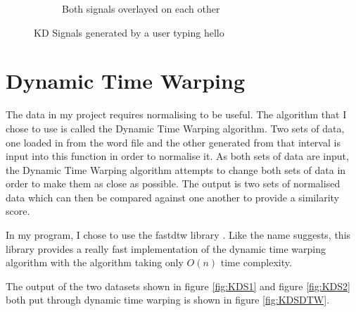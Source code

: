 \documentclass[10pt,a4paper]{report}
\begin{document}
\begin{figure}
\begin{subfigure}[b]{0.3\textwidth}
		\caption{Both signals overlayed on each other}
		\label{fig:KDSBoth}
	\end{subfigure}
	\caption{KD Signals generated by a user typing hello}
	\label{fig:KDS}
\end{figure}

\section{Dynamic Time Warping}

The data in my project requires normalising to be useful. The algorithm that I chose to use is called the Dynamic Time Warping algorithm. Two sets of data, one loaded in from the word file and the other generated from that interval is input into this function in order to normalise it. As both sets of data are input, the Dynamic Time Warping algorithm attempts to change both sets of data in order to make them as close as possible. The output is two sets of normalised data which can then be compared against one another to provide a similarity score. 

In my program, I chose to use the fastdtw library \cite{tandi_2015}. Like the name suggests, this library provides a really fast implementation of the dynamic time warping algorithm with the algorithm taking only \(O(n)\) time complexity\cite{tandi_2015}.

The output of the two datasets shown in figure \ref{fig:KDS1} and figure \ref{fig:KDS2} both put through dynamic time warping is shown in figure \ref{fig:KDSDTW}.
\end{document}
